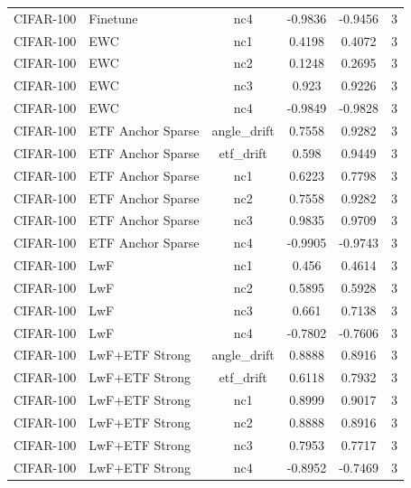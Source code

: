 \begin{tabular}{llcccc}
CIFAR-100 & Finetune & nc4 & -0.9836 & -0.9456 & 3 \\
CIFAR-100 & EWC & nc1 & 0.4198 & 0.4072 & 3 \\
CIFAR-100 & EWC & nc2 & 0.1248 & 0.2695 & 3 \\
CIFAR-100 & EWC & nc3 & 0.923 & 0.9226 & 3 \\
CIFAR-100 & EWC & nc4 & -0.9849 & -0.9828 & 3 \\
CIFAR-100 & ETF Anchor Sparse & angle\_drift & 0.7558 & 0.9282 & 3 \\
CIFAR-100 & ETF Anchor Sparse & etf\_drift & 0.598 & 0.9449 & 3 \\
CIFAR-100 & ETF Anchor Sparse & nc1 & 0.6223 & 0.7798 & 3 \\
CIFAR-100 & ETF Anchor Sparse & nc2 & 0.7558 & 0.9282 & 3 \\
CIFAR-100 & ETF Anchor Sparse & nc3 & 0.9835 & 0.9709 & 3 \\
CIFAR-100 & ETF Anchor Sparse & nc4 & -0.9905 & -0.9743 & 3 \\
CIFAR-100 & LwF & nc1 & 0.456 & 0.4614 & 3 \\
CIFAR-100 & LwF & nc2 & 0.5895 & 0.5928 & 3 \\
CIFAR-100 & LwF & nc3 & 0.661 & 0.7138 & 3 \\
CIFAR-100 & LwF & nc4 & -0.7802 & -0.7606 & 3 \\
CIFAR-100 & LwF+ETF Strong & angle\_drift & 0.8888 & 0.8916 & 3 \\
CIFAR-100 & LwF+ETF Strong & etf\_drift & 0.6118 & 0.7932 & 3 \\
CIFAR-100 & LwF+ETF Strong & nc1 & 0.8999 & 0.9017 & 3 \\
CIFAR-100 & LwF+ETF Strong & nc2 & 0.8888 & 0.8916 & 3 \\
CIFAR-100 & LwF+ETF Strong & nc3 & 0.7953 & 0.7717 & 3 \\
CIFAR-100 & LwF+ETF Strong & nc4 & -0.8952 & -0.7469 & 3 \\
\hline
\end{tabular}
